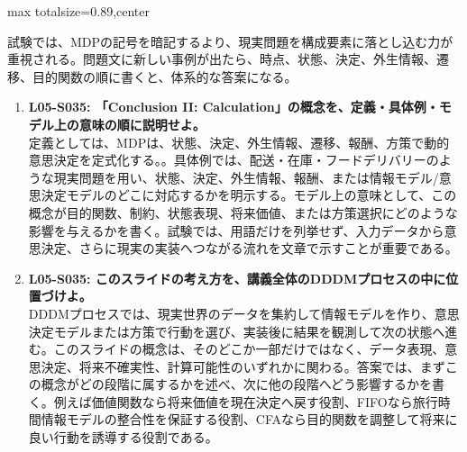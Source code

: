 \begin{minipage}[t]{0.58\textwidth}
\begin{adjustbox}{max totalsize={\textwidth}{0.89\textheight},center}
\begin{minipage}{\textwidth}
試験では、MDPの記号を暗記するより、現実問題を構成要素に落とし込む力が重視される。問題文に新しい事例が出たら、時点、状態、決定、外生情報、遷移、目的関数の順に書くと、体系的な答案になる。\par{}\begin{enumerate}\item \textbf{L05-S035: 「Conclusion II: Calculation」の概念を、定義・具体例・モデル上の意味の順に説明せよ。}\\定義としては、MDPは、状態、決定、外生情報、遷移、報酬、方策で動的意思決定を定式化する。。具体例では、配送・在庫・フードデリバリーのような現実問題を用い、状態、決定、外生情報、報酬、または情報モデル/意思決定モデルのどこに対応するかを明示する。モデル上の意味として、この概念が目的関数、制約、状態表現、将来価値、または方策選択にどのような影響を与えるかを書く。試験では、用語だけを列挙せず、入力データから意思決定、さらに現実の実装へつながる流れを文章で示すことが重要である。\item \textbf{L05-S035: このスライドの考え方を、講義全体のDDDMプロセスの中に位置づけよ。}\\DDDMプロセスでは、現実世界のデータを集約して情報モデルを作り、意思決定モデルまたは方策で行動を選び、実装後に結果を観測して次の状態へ進む。このスライドの概念は、そのどこか一部だけではなく、データ表現、意思決定、将来不確実性、計算可能性のいずれかに関わる。答案では、まずこの概念がどの段階に属するかを述べ、次に他の段階へどう影響するかを書く。例えば価値関数なら将来価値を現在決定へ戻す役割、FIFOなら旅行時間情報モデルの整合性を保証する役割、CFAなら目的関数を調整して将来に良い行動を誘導する役割である。\end{enumerate}
\end{minipage}
\end{adjustbox}
\end{minipage}


